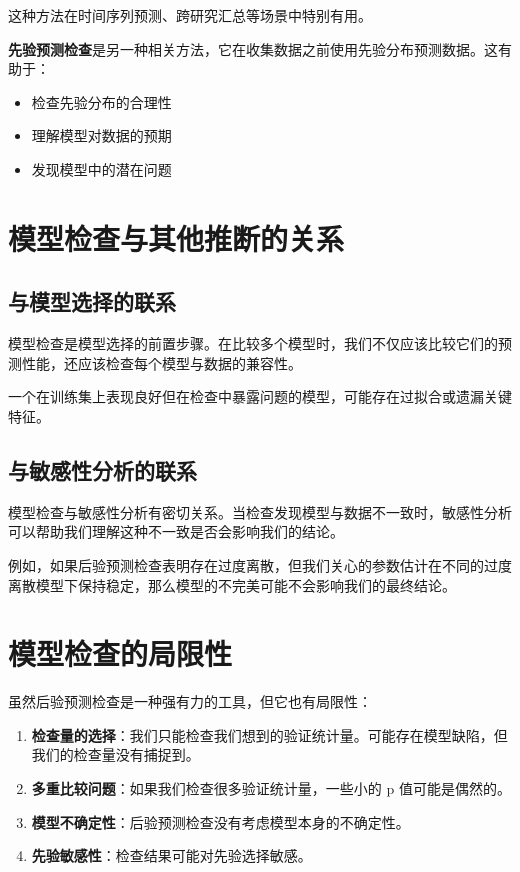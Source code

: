 这种方法在时间序列预测、跨研究汇总等场景中特别有用。

\textbf{先验预测检查}是另一种相关方法，它在收集数据之前使用先验分布预测数据。这有助于：

\begin{itemize}
  \item 检查先验分布的合理性
  \item 理解模型对数据的预期
  \item 发现模型中的潜在问题
\end{itemize}

\section{模型检查与其他推断的关系}

\subsection{与模型选择的联系}

模型检查是模型选择的前置步骤。在比较多个模型时，我们不仅应该比较它们的预测性能，还应该检查每个模型与数据的兼容性。

一个在训练集上表现良好但在检查中暴露问题的模型，可能存在过拟合或遗漏关键特征。

\subsection{与敏感性分析的联系}

模型检查与敏感性分析有密切关系。当检查发现模型与数据不一致时，敏感性分析可以帮助我们理解这种不一致是否会影响我们的结论。

例如，如果后验预测检查表明存在过度离散，但我们关心的参数估计在不同的过度离散模型下保持稳定，那么模型的不完美可能不会影响我们的最终结论。

\section{模型检查的局限性}

虽然后验预测检查是一种强有力的工具，但它也有局限性：

\begin{enumerate}
  \item \textbf{检查量的选择}：我们只能检查我们想到的验证统计量。可能存在模型缺陷，但我们的检查量没有捕捉到。
  \item \textbf{多重比较问题}：如果我们检查很多验证统计量，一些小的 p 值可能是偶然的。
  \item \textbf{模型不确定性}：后验预测检查没有考虑模型本身的不确定性。
  \item \textbf{先验敏感性}：检查结果可能对先验选择敏感。
\end{enumerate}

